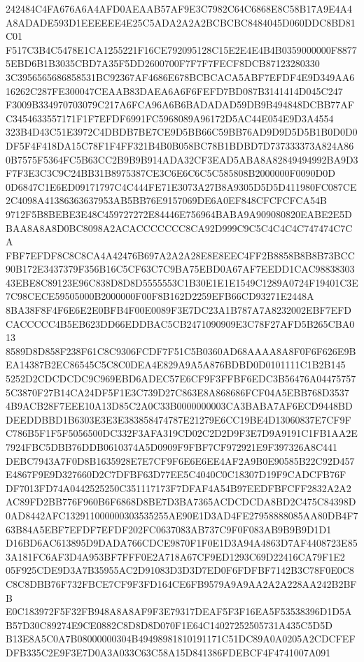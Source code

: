 \documentclass[UTF8,fontset=fandol,zihao=-4,a4paper]{ctexart}
\begin{document}
{{242484C4FA676A6A4AFD0AEAAB57AF9E3C7982C64C6868E8C58B17A9E4A4A8ADADE593D1EEEEEE4E25C5ADA2A2A2BCBCBC8484045D060DDC8BD81C01
F517C3B4C5478E1CA1255221F16CE792095128C15E2E4E4B4B0359000000F88775EBD6B1B3035CBD7A35F5DD2600700F7F7F7FECF8DCB87123280330
3C3956565686858531BC92367AF4686E678BCBCACA5ABF7EFDF4E9D349AA616262C287FE300047CEAAB83DAEA6A6F6FEFD7BD087B3141414D045C247
F3009B334970703079C217A6FCA96A6B6BADADAD59DB9B494848DCBB77AFC3454633557171F1F7EFDF6991FC5968089A96172D5AC44E054E9D3A4554
323B4D43C51E3972C4DBDB7BE7CE9D5BB66C59BB76AD9D9D5D5B1B0D0D0DF5F4F418DA15C78F1F4FF321B4B0B058BC78B1BDBD7D737333373A824A86
0B7575F5364FC5B63CC2B9B9B914ADA32CF3EAD5ABA8A82849494992BA9D3F7F3E3C3C9C24BB31B8975387CE3C6E6C6C5C585808B2000000F0090D0D
0D6847C1E6ED09171797C4C444FE71E3073A27B8A9305D5D5D411980FC087CE2C4098A41386363637953AB5BB76E9157069DE6A0EF848CFCFCFCA54B
9712F5B8BEBE3E48C459727272E84446E756964BABA9A909080820EABE2E5DBAA8A8A8D0BC8098A2ACACCCCCCC8CA92D999C9C5C4C4C4C747474C7CA
FBF7EFDF8C8C8CA4A42476B697A2A2A28E8E8EEC4FF2B8858B8B8B73BCC90B172E3437379F356B16C5CF63C7C9BA75EBD0A67AF7EEDD1CAC98838303
43EBE8C89123E96C838D8D8D5555553C1B30E1E1E1549C1289A0724F19401C3E7C98CECE59505000B2000000F00F8B162D2259EFB66CD93271E2448A
8BA38F8F4F6E6E2E0BFB4F00E0089F3E7DC23A1B787A7A8232002EBF7EFDCACCCCC4B5EB623DD66EDDBAC5CB2471090909E3C78F27AFD5B265CBA013
8589D8D858F238F61C8C9306FCDF7F51C5B0360AD68AAAA8A8F0F6F626E9BEA14387B2EC86545C5C8C0DEA4E829A9A5A876BDBD0D0101111C1B2B145
5252D2CDCDCDC9C969EBD6ADEC57E6CF9F3FFBF6EDC3B56476A044757575C3870F27B14CA24DF5F1E3C739D27C863E8A868686FCF04A5EBB768D3537
4B9ACB28F7EEE10A13D85C2A0C33B0000000003CA3BABA7AF6ECD9448BDDEEDDBBD1B6303E3E3E383858474787E21279E6CC19BE4D13060837E7CF9F
C786B5F1F5F5056500DC332F3AFA319CD02C2D2D9F3E7D9A9191C1FB1AA2E7924FBC5DBB76DDB0610374A5D0909F9FBF7CF972921E9F397326A8C441
DEBC7943A7F0D8B1635928E7E7CF9F6E6E6EE4AF2A9B0E90585B22C92D457E4867F9E9D327660D2C7DFBF63D77EE5C4040C0C18307D19F9CADCFB76F
DF7013FD74A0442525250C351117173F7DFAF4A54B97EEDFBFCFF2832A2A2AC89FD2BB776F960B6F6868D8BE7D3BA7365ACDCDCDA8BD2C475C84398D
0AD8442AFC132911000000303535255AE90E1D3AD4FE27958888085AA80DB4F763B84A5EBF7EFDF7EFDF202FC0637083AB737C9F0F083AB9B9B9D1D1
D16BD6AC613895D9DADA766CDCE9870F1F0E1D3A94A4863D7AF4408723E853A181FC6AF3D4A953BF7FFF0E2A718A67CF9ED1293C69D22416CA79F1E2
05F925CDE9D3A7B35955AC2D91083D3D3D7ED0F6FDFBF7142B3C78F0E0C8C8C8DBB76F732FBCE7CF9F3FD164CE6FB9579A9A9AA2A2A228AA242B2BFB
E0C183972F5F32FB948A8A8AF9F3E79317DEAF5F3F16EA5F53538396D1D5AB57D30C89274E9CE0882C8D8D8D070F1E64C14027252505731A435C5D5D
B13E8A5C0A7B08000000304B49498981810191171C51DC89A0A0205A2CDCFEFDFB335C2E9F3E7D0A3A033C63C58A15D841386FDEBCF4F4741007A091
}}
\end{document}
